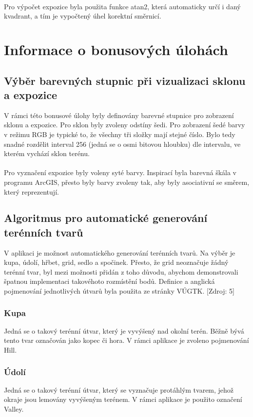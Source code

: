\documentclass[a4paper, 12pt]{article}
\begin{document}
\

Pro výpočet expozice byla použita funkce atan2, která automaticky určí i daný kvadrant, a tím je vypočtený úhel korektní směrnicí.

\section{Informace o bonusových úlohách}
\subsection{Výběr barevných stupnic při vizualizaci sklonu a expozice}
V rámci této bonusové úlohy byly definovány barevné stupnice pro zobrazení sklonu a expozice. Pro sklon byly zvoleny odstíny šedi. Pro zobrazení šedé barvy v režimu RGB je typické to, že všechny tři složky mají stejné číslo. Bylo tedy snadné rozdělit interval 256 (jedná se o osmi bitovou hloubku) dle intervalu, ve kterém vychází sklon terénu.\\
\\
Pro vyznačení expozice byly voleny syté barvy. Inspirací byla barevná škála v programu ArcGIS, přesto byly barvy zvoleny tak, aby byly asociativní se směrem, který reprezentují.

\subsection{Algoritmus pro automatické generování terénních tvarů}
V aplikaci je možnost automatického generování terénních tvarů. Na výběr je kupa, údolí, hřbet, grid, sedlo a spočinek. Přesto, že grid neoznačuje žádný terénní tvar, byl mezi možnosti přidán z toho důvodu, abychom demonstrovali špatnou implementaci takovéhoto rozmístění bodů. Definice a anglická pojmenování jednotlivých útvarů byla použita ze stránky VÚGTK. [Zdroj: 5]

\subsubsection{Kupa}
Jedná se o takový terénní útvar, který je vyvýšený nad okolní terén. Běžně bývá tento tvar označován jako kopec či hora. V rámci aplikace je zvoleno pojmenování Hill.

\subsubsection{Údolí}
Jedná se o takový terénní útvar, který se vyznačuje protáhlým tvarem, jehož okraje jsou lemovány vyvýšeným terénem. V rámci aplikace je použito označení Valley.
\end{document}
